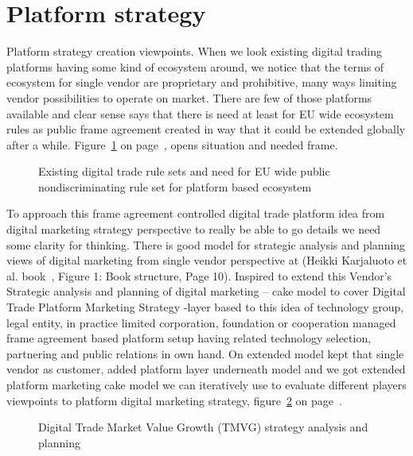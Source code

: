 \section{Platform strategy}\label{platform_strategy}
Platform strategy creation viewpoints.
When we look ex\-ist\-ing digital trading platforms having some kind of
ecosystem around, we notice that the terms of ecosystem for single vendor are
proprietary and prohibitive, many ways limiting vendor possibilities to
operate on market. There are few of those platforms available and clear sense
says that there is need at least for EU wide ecosystem rules as public frame
agreement created in way that it could be extended globally after a while.
Figure~\ref{fig:TermSets} on page~\pageref{fig:TermSets}, opens situation and
needed frame.

\begin{figure} %
 \begin{center}
  \caption{Existing digital trade rule sets and need for EU wide public
  nondiscriminating rule set for platform based ecosystem}\label{fig:TermSets}
 \end{center}
\end{figure}

To approach this frame agreement controlled digital trade platform idea from
digital marketing strategy perspective to really be able to go details we
need some clarity for thinking. There is good model for strategic analysis and
planning views of digital marketing from single vendor perspective at (Heikki
Karjaluoto et al. book~\cite{Karjaluoto2022}, Figure 1: Book structure, Page
10). Inspired to extend this Vendor's Strategic analysis and planning of
digital marketing -- cake model to cover Digital Trade Platform Marketing
Strategy -layer based to this idea of technology group, legal entity, in
practice limited corporation, foundation or cooperation managed frame
agreement based platform setup having related technology selection, partnering
and public relations in own hand. On extended model kept that single vendor as
customer, added platform layer underneath model and we got extended platform
marketing cake model we can iteratively use to evaluate different players
viewpoints to platform digital marketing strategy,
figure~\ref{fig:TradeMarketValueGrowth} on
page~\pageref{fig:TradeMarketValueGrowth}.

\begin{figure} %
 \begin{center}
  \caption{Digital Trade Market Value Growth (TMVG)
  strategy analysis and planning}\label{fig:TradeMarketValueGrowth}
 \end{center}
\end{figure}

